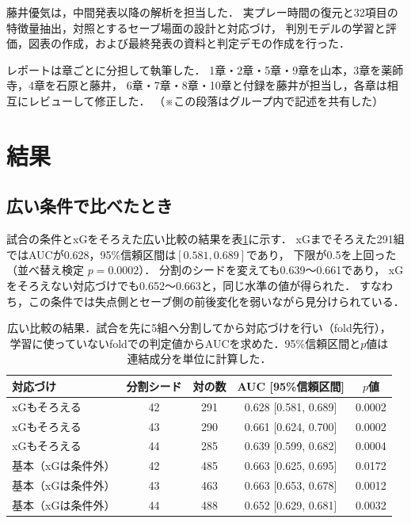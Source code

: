 \documentclass[11pt]{ujarticle} %
\begin{document}
藤井優気は，中間発表以降の解析を担当した．
実プレー時間の復元と32項目の特徴量抽出，対照とするセーブ場面の設計と対応づけ，
判別モデルの学習と評価，図表の作成，および最終発表の資料と判定デモの作成を行った．

レポートは章ごとに分担して執筆した．
1章・2章・5章・9章を山本，3章を薬師寺，4章を石原と藤井，
6章・7章・8章・10章と付録を藤井が担当し，各章は相互にレビューして修正した．
（※この段落はグループ内で記述を共有した）

\section{結果}
\label{sec:result}

\subsection{広い条件で比べたとき}

試合の条件とxGをそろえた広い比較の結果を表\ref{tab:broad}に示す．
xGまでそろえた291組ではAUCが0.628，95\%信頼区間は$[0.581, 0.689]$であり，
下限が0.5を上回った（並べ替え検定 $p = 0.0002$）．
分割のシードを変えても0.639〜0.661であり，
xGをそろえない対応づけでも0.652〜0.663と，同じ水準の値が得られた．
すなわち，この条件では失点側とセーブ側の前後変化を弱いながら見分けられている．

\begin{table}[htbp]
    \centering
    \caption{広い比較の結果．試合を先に5組へ分割してから対応づけを行い（fold先行），学習に使っていないfoldでの判定値からAUCを求めた．95\%信頼区間と$p$値は連結成分を単位に計算した．}
    \label{tab:broad}
    \begin{tabular}{|l|c|c|c|c|}
    \hline
    対応づけ & 分割シード & 対の数 & AUC [95\%信頼区間] & $p$値 \\
    \hline
    xGもそろえる & 42 & 291 & 0.628 [0.581, 0.689] & 0.0002 \\
    \hline
    xGもそろえる & 43 & 290 & 0.661 [0.624, 0.700] & 0.0002 \\
    \hline
    xGもそろえる & 44 & 285 & 0.639 [0.599, 0.682] & 0.0004 \\
    \hline
    基本（xGは条件外） & 42 & 485 & 0.663 [0.625, 0.695] & 0.0172 \\
    \hline
    基本（xGは条件外） & 43 & 463 & 0.663 [0.653, 0.678] & 0.0012 \\
    \hline
    基本（xGは条件外） & 44 & 488 & 0.652 [0.629, 0.681] & 0.0032 \\
    \hline
    \end{tabular}
\end{table}
\end{document}
